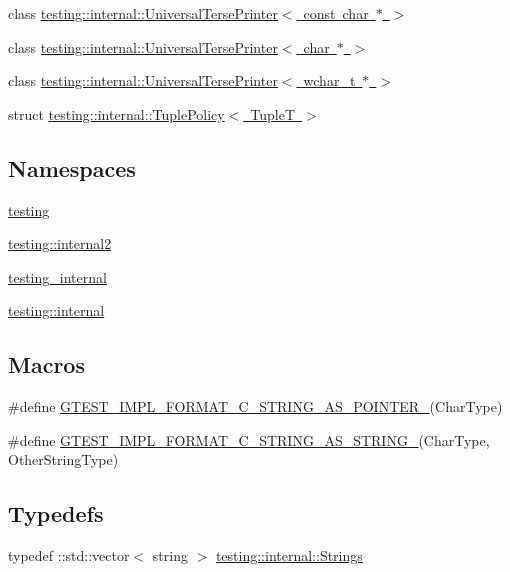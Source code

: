\begin{DoxyCompactItemize}
\item 
class \mbox{\hyperlink{classtesting_1_1internal_1_1_universal_terse_printer_3_01const_01char_01_5_01_4}{testing\+::internal\+::\+Universal\+Terse\+Printer$<$ const char $\ast$ $>$}}
\item 
class \mbox{\hyperlink{classtesting_1_1internal_1_1_universal_terse_printer_3_01char_01_5_01_4}{testing\+::internal\+::\+Universal\+Terse\+Printer$<$ char $\ast$ $>$}}
\item 
class \mbox{\hyperlink{classtesting_1_1internal_1_1_universal_terse_printer_3_01wchar__t_01_5_01_4}{testing\+::internal\+::\+Universal\+Terse\+Printer$<$ wchar\+\_\+t $\ast$ $>$}}
\item 
struct \mbox{\hyperlink{structtesting_1_1internal_1_1_tuple_policy}{testing\+::internal\+::\+Tuple\+Policy$<$ Tuple\+T $>$}}
\end{DoxyCompactItemize}
\subsection*{Namespaces}
\begin{DoxyCompactItemize}
\item 
 \mbox{\hyperlink{namespacetesting}{testing}}
\item 
 \mbox{\hyperlink{namespacetesting_1_1internal2}{testing\+::internal2}}
\item 
 \mbox{\hyperlink{namespacetesting__internal}{testing\+\_\+internal}}
\item 
 \mbox{\hyperlink{namespacetesting_1_1internal}{testing\+::internal}}
\end{DoxyCompactItemize}
\subsection*{Macros}
\begin{DoxyCompactItemize}
\item 
\#define \mbox{\hyperlink{gtest-printers_8h_a79d4724b4bc2a1dd8493c366b5ca626a}{G\+T\+E\+S\+T\+\_\+\+I\+M\+P\+L\+\_\+\+F\+O\+R\+M\+A\+T\+\_\+\+C\+\_\+\+S\+T\+R\+I\+N\+G\+\_\+\+A\+S\+\_\+\+P\+O\+I\+N\+T\+E\+R\+\_\+}}(Char\+Type)
\item 
\#define \mbox{\hyperlink{gtest-printers_8h_ad6102ed2a0571d5196e606a061c16a10}{G\+T\+E\+S\+T\+\_\+\+I\+M\+P\+L\+\_\+\+F\+O\+R\+M\+A\+T\+\_\+\+C\+\_\+\+S\+T\+R\+I\+N\+G\+\_\+\+A\+S\+\_\+\+S\+T\+R\+I\+N\+G\+\_\+}}(Char\+Type,  Other\+String\+Type)
\end{DoxyCompactItemize}
\subsection*{Typedefs}
\begin{DoxyCompactItemize}
\item 
typedef \+::std\+::vector$<$ string $>$ \mbox{\hyperlink{namespacetesting_1_1internal_a7706b17f05f4b49e351b052ae4e05073}{testing\+::internal\+::\+Strings}}
\end{DoxyCompactItemize}

